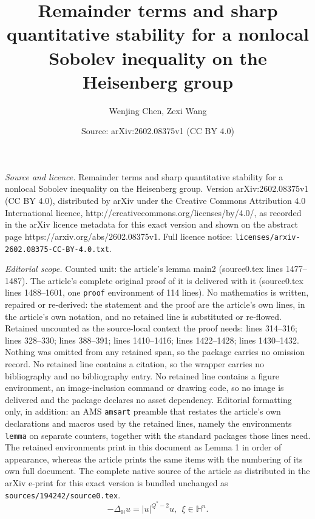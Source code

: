 \documentclass[10pt,a4paper]{amsart}
\title{Remainder terms and sharp quantitative stability for a nonlocal Sobolev inequality on the Heisenberg group}
\author{Wenjing Chen, Zexi Wang}
\date{Source: arXiv:2602.08375v1 (CC BY 4.0)}
\begin{document}
\maketitle

\noindent\emph{Source and licence.} Remainder terms and sharp quantitative stability for a nonlocal Sobolev inequality on the Heisenberg group. Version arXiv:2602.08375v1 (CC BY 4.0), distributed by arXiv under the Creative Commons Attribution 4.0 International licence, http://creativecommons.org/licenses/by/4.0/, as recorded in the arXiv licence metadata for this exact version and shown on the abstract page https://arxiv.org/abs/2602.08375v1. Full licence notice: \texttt{licenses/arxiv-2602.08375-CC-BY-4.0.txt}.\par\smallskip

\noindent\textit{Editorial scope.} Counted unit: the article's lemma main2 (source0.tex lines 1477--1487). The article's complete original proof of it is delivered with it (source0.tex lines 1488--1601, one \texttt{proof} environment of 114 lines). No mathematics is written, repaired or re-derived: the statement and the proof are the article's own lines, in the article's own notation, and no retained line is substituted or re-flowed.  Retained uncounted as the source-local context the proof needs: lines 314--316; lines 328--330; lines 388--391; lines 1410--1416; lines 1422--1428; lines 1430--1432.  Nothing was omitted from any retained span, so the package carries no omission record.  No retained line contains a citation, so the wrapper carries no bibliography and no bibliography entry.  No retained line contains a figure environment, an image-inclusion command or drawing code, so no image is delivered and the package declares no asset dependency.  Editorial formatting only, in addition: an AMS \texttt{amsart} preamble that restates the article's own declarations and macros used by the retained lines, namely the environments \texttt{lemma} on separate counters, together with the standard packages those lines need.  The retained environments print in this document as Lemma 1 in order of appearance, whereas the article prints the same items with the numbering of its own full document.  The complete native source of the article as distributed in the arXiv e-print for this exact version is bundled unchanged as \texttt{sources/194242/source0.tex}.
\begin{equation}\label{limit1}
  -\Delta_{\mathbb{H}} u=|u|^{Q^*-2}u,~~\xi\in\mathbb{H}^{n}.
\end{equation}
\end{document}
